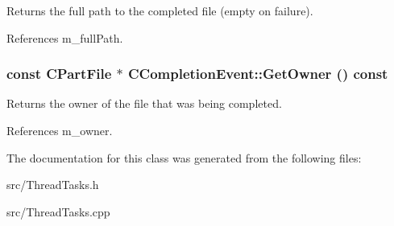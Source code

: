 Returns the full path to the completed file (empty on failure). 

References m\_\-fullPath.
\subsubsection[{GetOwner}]{\setlength{\rightskip}{0pt plus 5cm}const {\bf CPartFile} $\ast$ CCompletionEvent::GetOwner () const}\label{classCCompletionEvent_a53cffbd6600eac346c3b40bc4a11cc48}


Returns the owner of the file that was being completed. 

References m\_\-owner.

The documentation for this class was generated from the following files:\begin{DoxyCompactItemize}
\item 
src/ThreadTasks.h\item 
src/ThreadTasks.cpp\end{DoxyCompactItemize}
